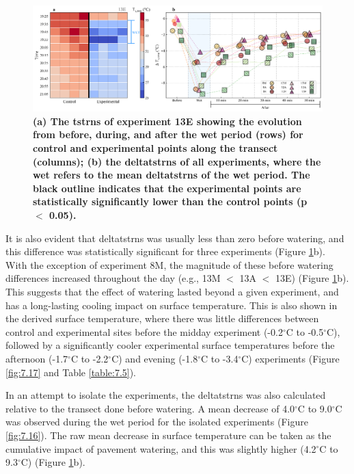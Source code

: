 \documentclass[final,3p,times,authoryear]{elsarticle}
\begin{document}
\begin{figure}
\centering
\includegraphics[trim={0 0 0 0},clip,scale=1.0]{pict016.png}
\caption{\bf (a) The \gls{tstrns} of experiment 13E showing the evolution from before, during, and after the wet period (rows) for control and experimental points along the transect (columns); (b) the \gls{deltatstrns} of all experiments, where the wet refers to the mean \gls{deltatstrns} of the wet period. The black outline indicates that the experimental points are statistically significantly lower than the control points (\gls{p} $<$ 0.05).}
 \label{fig:3.5}
\end{figure}

It is also evident that \gls{deltatstrns} was usually less than zero before watering, and this difference was statistically significant for three experiments (Figure \ref{fig:3.5}b). With the exception of experiment 8M, the magnitude of these before watering differences increased throughout the day (e.g., 13M $<$ 13A $<$ 13E) (Figure \ref{fig:3.5}b). This suggests that the effect of watering lasted beyond a given experiment, and has a long-lasting cooling impact on surface temperature. This is also shown in the derived surface temperature, where there was little differences between control and experimental sites before the midday experiment (-0.2$^{\circ}$C to -0.5$^{\circ}$C), followed by a significantly cooler experimental surface temperatures before the afternoon (-1.7$^{\circ}$C to -2.2$^{\circ}$C) and evening (-1.8$^{\circ}$C to -3.4$^{\circ}$C) experiments (Figure \ref{fig:7.17} and Table \ref{table:7.5}).

In an attempt to isolate the experiments, the \gls{deltatstrns} was also calculated relative to the transect done before watering. A mean decrease of 4.0$^{\circ}$C to 9.0$^{\circ}$C was observed during the wet period for the isolated experiments (Figure \ref{fig:7.16}). The raw mean decrease in surface temperature can be taken as the cumulative impact of pavement watering, and this was slightly higher (4.2$^{\circ}$C to 9.3$^{\circ}$C) (Figure \ref{fig:3.5}b).
\end{document}
